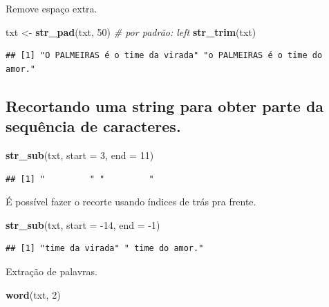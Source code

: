 \documentclass[]{book}
\newenvironment{Shaded}{\begin{snugshade}}{\end{snugshade}}
\newcommand{\CommentTok}[1]{\textcolor[rgb]{0.56,0.35,0.01}{\textit{#1}}}
\newcommand{\DataTypeTok}[1]{\textcolor[rgb]{0.13,0.29,0.53}{#1}}
\newcommand{\DecValTok}[1]{\textcolor[rgb]{0.00,0.00,0.81}{#1}}
\newcommand{\KeywordTok}[1]{\textcolor[rgb]{0.13,0.29,0.53}{\textbf{#1}}}
\newcommand{\NormalTok}[1]{#1}
\newcommand{\StringTok}[1]{\textcolor[rgb]{0.31,0.60,0.02}{#1}}
\begin{document}
Remove espaço extra.

\begin{Shaded}
\begin{Highlighting}[]
\NormalTok{txt <-}\StringTok{ }\KeywordTok{str_pad}\NormalTok{(txt, }\DecValTok{50}\NormalTok{) }\CommentTok{# por padrão: left}
\KeywordTok{str_trim}\NormalTok{(txt)}
\end{Highlighting}
\end{Shaded}

\begin{verbatim}
## [1] "O PALMEIRAS é o time da virada" "o PALMEIRAS é o time do amor."
\end{verbatim}

\hypertarget{recortando-uma-string-para-obter-parte-da-sequuxeancia-de-caracteres.}{%
\subsection{Recortando uma string para obter parte da sequência de caracteres.}\label{recortando-uma-string-para-obter-parte-da-sequuxeancia-de-caracteres.}}

\begin{Shaded}
\begin{Highlighting}[]
\KeywordTok{str_sub}\NormalTok{(txt, }\DataTypeTok{start =} \DecValTok{3}\NormalTok{, }\DataTypeTok{end =} \DecValTok{11}\NormalTok{)}
\end{Highlighting}
\end{Shaded}

\begin{verbatim}
## [1] "         " "         "
\end{verbatim}

É possível fazer o recorte usando índices de trás pra frente.

\begin{Shaded}
\begin{Highlighting}[]
\KeywordTok{str_sub}\NormalTok{(txt, }\DataTypeTok{start =} \DecValTok{-14}\NormalTok{, }\DataTypeTok{end =} \DecValTok{-1}\NormalTok{)}
\end{Highlighting}
\end{Shaded}

\begin{verbatim}
## [1] "time da virada" " time do amor."
\end{verbatim}

Extração de palavras.

\begin{Shaded}
\begin{Highlighting}[]
\KeywordTok{word}\NormalTok{(txt, }\DecValTok{2}\NormalTok{)}
\end{Highlighting}
\end{Shaded}
\end{document}
